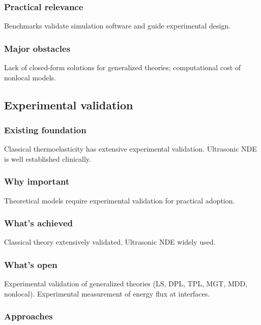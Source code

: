 \subsubsection{Practical relevance}

Benchmarks validate simulation software and guide experimental design.

\subsubsection{Major obstacles}

Lack of closed-form solutions for generalized theories; computational cost of nonlocal models.

\subsection{Experimental validation}
\label{sec:15.4}

\subsubsection{Existing foundation}

Classical thermoelasticity has extensive experimental validation. Ultrasonic NDE is well established clinically.

\subsubsection{Why important}

Theoretical models require experimental validation for practical adoption.

\subsubsection{What's achieved}

Classical theory extensively validated. Ultrasonic NDE widely used.

\subsubsection{What's open}

Experimental validation of generalized theories (LS, DPL, TPL, MGT, MDD, nonlocal). Experimental measurement of energy flux at interfaces.

\subsubsection{Approaches}

